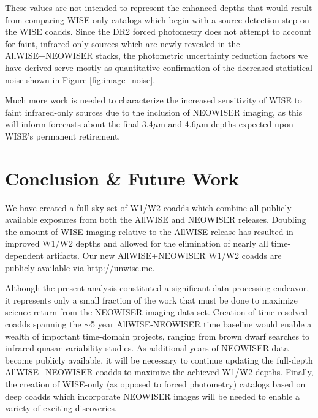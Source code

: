 \documentclass{emulateapj}
\begin{document}
These values are not intended to represent the enhanced
depths that would result from comparing WISE-only catalogs which begin with
a source detection step on the WISE coadds. Since the DR2 forced photometry 
does not attempt to account for faint, infrared-only sources which are
newly revealed in the AllWISE+NEOWISER stacks, the photometric uncertainty
reduction factors we have derived serve mostly as quantitative confirmation 
of the decreased statistical noise shown in Figure \ref{fig:image_noise}.

Much more work is needed to characterize the increased sensitivity
of WISE to faint infrared-only sources due to the inclusion of NEOWISER
imaging, as this will inform forecasts about the final 3.4$\mu$m and 
4.6$\mu$m depths expected upon WISE's permanent retirement.

\section{Conclusion \& Future Work}
\label{sec:future}

We have created a full-sky set of W1/W2 coadds which combine all publicly
available exposures from both the AllWISE and NEOWISER releases. Doubling the 
amount of WISE imaging relative to the AllWISE release has resulted in improved
W1/W2 depths and allowed for the elimination of nearly all time-dependent 
artifacts. Our new AllWISE+NEOWISER W1/W2 coadds are publicly available
via http://unwise.me.


Although the present analysis constituted a significant data processing 
endeavor, it represents only a small fraction of the work that must
be done to maximize science return from the NEOWISER imaging data set.
Creation of time-resolved coadds spanning the $\sim$5 year AllWISE-NEOWISER
time baseline would enable a wealth of important time-domain projects,
ranging from brown dwarf searches to infrared quasar variability studies. As
additional years of NEOWISER data become publicly available, it will be 
necessary to continue updating the full-depth AllWISE+NEOWISER coadds to 
maximize the achieved W1/W2 depths. Finally, the creation of WISE-only (as 
opposed to forced photometry) catalogs based on deep coadds which incorporate
NEOWISER images will be needed to enable a variety of exciting discoveries.
\end{document}
